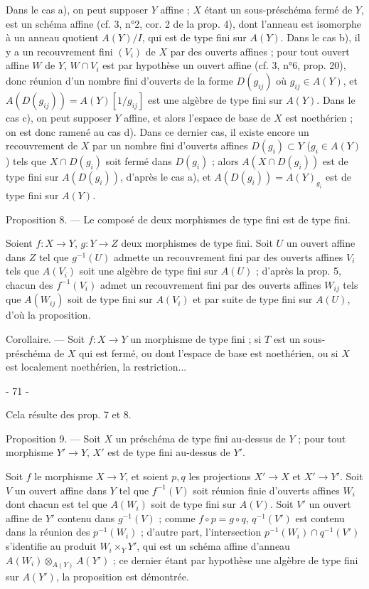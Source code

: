 Dans le cas a), on peut supposer $Y$ affine ; $X$ étant un sous-préschéma fermé de $Y$, est un schéma affine (cf. 3, n°2, cor. 2 de la prop. 4), dont l'anneau est isomorphe à un anneau quotient $A(Y)/I$, qui est de type fini sur $A(Y)$. Dans le cas b), il y a un recouvrement fini $(V_i)$ de $X$ par des ouverts affines ; pour tout ouvert affine $W$ de $Y$, $W \cap V_i$ est par hypothèse un ouvert affine (cf. 3, n°6, prop. 20), donc réunion d'un nombre fini d'ouverts de la forme $D(g_{ij})$ où $g_{ij} \in A(Y)$, et $A(D(g_{ij})) = A(Y)[1/g_{ij}]$ est une algèbre de type fini sur $A(Y)$. Dans le cas c), on peut supposer $Y$ affine, et alors l'espace de base de $X$ est noethérien ; on est donc ramené au cas d). Dans ce dernier cas, il existe encore un recouvrement de $X$ par un nombre fini d'ouverts affines $D(g_i) \subset Y$ ($g_i \in A(Y)$) tels que $X \cap D(g_i)$ soit fermé dans $D(g_i)$ ; alors $A(X \cap D(g_i))$ est de type fini sur $A(D(g_i))$, d'après le cas a), et $A(D(g_i)) = A(Y)_{g_i}$ est de type fini sur $A(Y)$.

Proposition 8. — Le composé de deux morphismes de type fini est de type fini.

Soient $f : X \to Y$, $g : Y \to Z$ deux morphismes de type fini. Soit $U$ un ouvert affine dans $Z$ tel que $g^{-1}(U)$ admette un recouvrement fini par des ouverts affines $V_i$ tels que $A(V_i)$ soit une algèbre de type fini sur $A(U)$ ; d'après la prop. 5, chacun des $f^{-1}(V_i)$ admet un recouvrement fini par des ouverts affines $W_{ij}$ tels que $A(W_{ij})$ soit de type fini sur $A(V_i)$ et par suite de type fini sur $A(U)$, d'où la proposition.

Corollaire. — Soit $f : X \to Y$ un morphisme de type fini ; si $T$ est un sous-préschéma de $X$ qui est fermé, ou dont l'espace de base est noethérien, ou si $X$ est localement noethérien, la restriction...

\newpage


- 71 -

Cela résulte des prop. 7 et 8.

Proposition 9. — Soit $X$ un préschéma de type fini au-dessus de $Y$ ; pour tout morphisme $Y' \to Y$, $X'$ est de type fini au-dessus de $Y'$.

Soit $f$ le morphisme $X \to Y$, et soient $p, q$ les projections $X' \to X$ et $X' \to Y'$. Soit $V$ un ouvert affine dans $Y$ tel que $f^{-1}(V)$ soit réunion finie d'ouverts affines $W_i$ dont chacun est tel que $A(W_i)$ soit de type fini sur $A(V)$. Soit $V'$ un ouvert affine de $Y'$ contenu dans $g^{-1}(V)$ ; comme $f \circ p = g \circ q$, $q^{-1}(V')$ est contenu dans la réunion des $p^{-1}(W_i)$ ; d'autre part, l'intersection $p^{-1}(W_i) \cap q^{-1}(V')$ s'identifie au produit $W_i \times_Y Y'$, qui est un schéma affine d'anneau $A(W_i) \otimes_{A(Y)} A(Y')$ ; ce dernier étant par hypothèse une algèbre de type fini sur $A(Y')$, la proposition est démontrée.

